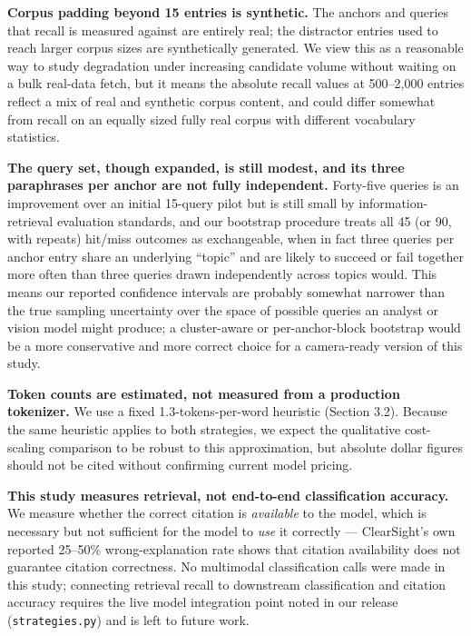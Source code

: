 \documentclass[11pt]{article}
\begin{document}
\textbf{Corpus padding beyond 15 entries is synthetic.} The anchors and queries that recall is measured against are entirely real; the distractor entries used to reach larger corpus sizes are synthetically generated. We view this as a reasonable way to study degradation under increasing candidate volume without waiting on a bulk real-data fetch, but it means the absolute recall values at 500--2{,}000 entries reflect a mix of real and synthetic corpus content, and could differ somewhat from recall on an equally sized fully real corpus with different vocabulary statistics.

\textbf{The query set, though expanded, is still modest, and its three paraphrases per anchor are not fully independent.} Forty-five queries is an improvement over an initial 15-query pilot but is still small by information-retrieval evaluation standards, and our bootstrap procedure treats all 45 (or 90, with repeats) hit/miss outcomes as exchangeable, when in fact three queries per anchor entry share an underlying ``topic'' and are likely to succeed or fail together more often than three queries drawn independently across topics would. This means our reported confidence intervals are probably somewhat narrower than the true sampling uncertainty over the space of possible queries an analyst or vision model might produce; a cluster-aware or per-anchor-block bootstrap would be a more conservative and more correct choice for a camera-ready version of this study.

\textbf{Token counts are estimated, not measured from a production tokenizer.} We use a fixed 1.3-tokens-per-word heuristic (Section 3.2). Because the same heuristic applies to both strategies, we expect the qualitative cost-scaling comparison to be robust to this approximation, but absolute dollar figures should not be cited without confirming current model pricing.

\textbf{This study measures retrieval, not end-to-end classification accuracy.} We measure whether the correct citation is \emph{available} to the model, which is necessary but not sufficient for the model to \emph{use} it correctly --- ClearSight's own reported 25--50\% wrong-explanation rate shows that citation availability does not guarantee citation correctness. No multimodal classification calls were made in this study; connecting retrieval recall to downstream classification and citation accuracy requires the live model integration point noted in our release (\texttt{strategies.py}) and is left to future work.
\end{document}
